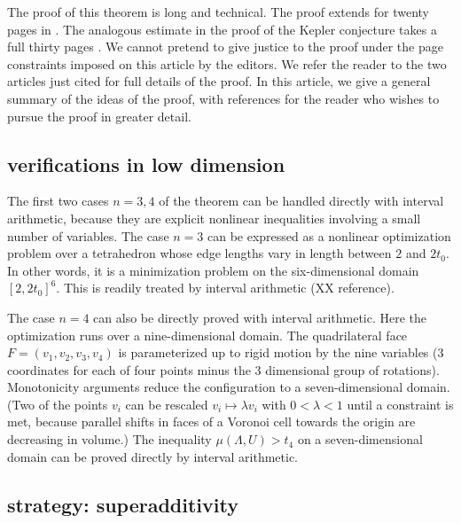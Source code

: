 The proof of this theorem is long and technical.  The proof extends for 
twenty pages in  \cite[pp.19-38]{arx}.  The analogous estimate in
the proof of the Kepler conjecture takes a full thirty pages 
\cite[pp.126-156]{DCG}.
We cannot pretend to give justice to the proof under the page constraints
imposed on this article by the editors.  We refer the reader to the
two articles just cited for full details of the proof.  In this article,
we give a general summary of the ideas of the proof, with 
references for the reader who wishes to pursue the proof in greater detail.

\subsection{verifications in low dimension}

The first two cases $n=3,4$ of the theorem can be handled directly with
interval arithmetic, because they are explicit nonlinear 
inequalities involving a small number of variables.  The case $n=3$ can
be expressed as a nonlinear optimization problem over a tetrahedron
whose edge lengths vary in length between $2$ and $2t_0$.  In other
words, it is a minimization problem on the six-dimensional 
domain $[2,2t_0]^6$. This is readily treated by interval arithmetic (XX reference).  

The case $n=4$ can also be directly proved with interval arithmetic.  
Here the optimization runs over a nine-dimensional domain.  The
quadrilateral face $F=(v_1,v_2,v_3,v_4)$ is parameterized up to rigid
motion by the nine variables (3 coordinates for each of four points
minus the 3 dimensional group of rotations).  Monotonicity arguments
reduce the configuration to a seven-dimensional domain.  (Two of the
points $v_i$ can be rescaled $v_i \mapsto \lambda v_i$ with $0 < \lambda < 1$ until a constraint is met, 
because parallel shifts in faces of a Voronoi cell towards the origin are decreasing in volume.)  The inequality $\mu(\Lambda,U)> t_4$ on
a seven-dimensional domain can be proved directly by interval arithmetic.

\subsection{strategy: superadditivity}

